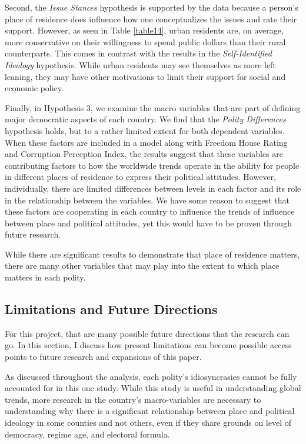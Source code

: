 \documentclass[12pt, titlepage]{article}
\newcommand\e{\emph}
\begin{document}
Second, the \e{Issue Stances} hypothesis is supported by the data because a person's place of residence does influence how one conceptualizes the issues and rate their support. However, as seen in Table \ref{table14}, urban residents are, on average, more conservative on their willingness to spend public dollars than their rural counterparts. This comes in contrast with the results in the \e{Self-Identified Ideology} hypothesis. While urban residents may see themselves as more left leaning, they may have other motivations to limit their support for social and economic policy.

Finally, in Hypothesis 3, we examine the macro variables that are part of defining major democratic aspects of each country. We find that the \e{Polity Differences} hypothesis holds, but to a rather limited extent for both dependent variables. When these factors are included in a model along with Freedom House Rating and Corruption Perception Index, the results suggest that these variables are contributing factors to how the worldwide trends operate in the ability for people in different places of residence to express their political attitudes. However, individually, there are limited differences between levels in each factor and its role in the relationship between the variables. We have some reason to suggest that these factors are cooperating in each country to influence the trends of influence between place and political attitudes, yet this would have to be proven through future research.

While there are significant results to demonstrate that place of residence matters, there are many other variables that may play into the extent to which place matters in each polity.

\subsection{Limitations and Future Directions}

For this project, that are many possible future directions that the research can go. In this section, I discuss how present limitations can become possible access points to future research and expansions of this paper.

As discussed throughout the analysis, each polity's idiosyncrasies cannot be fully accounted for in this one study. While this study is useful in understanding global trends, more research in the country's macro-variables are necessary to understanding why there is a significant relationship between place and political ideology in some counties and not others, even if they share grounds on level of democracy, regime age, and electoral formula.
\end{document}
